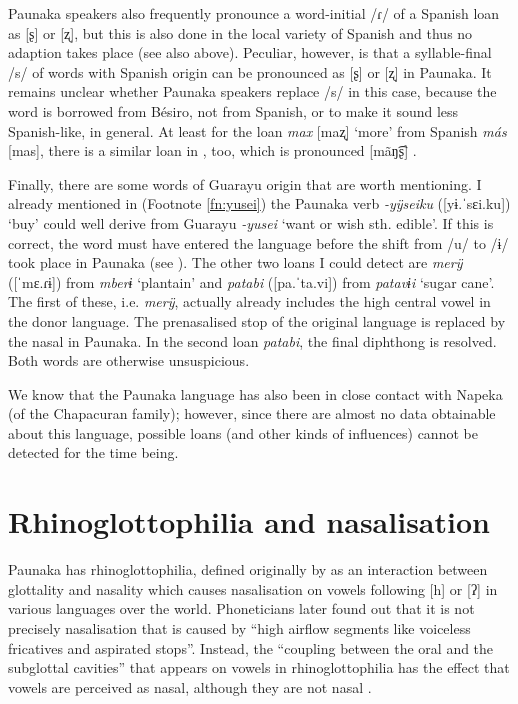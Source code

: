 Paunaka speakers also frequently pronounce a word-initial /ɾ/ of a Spanish loan as [ʂ] or [ʐ], but this is also done in the local variety of Spanish and thus no adaption takes place (see also  above). Peculiar, however, is that a syllable-final /s/ of words with Spanish origin can be pronounced as [ʂ] or [ʐ] in Paunaka. It remains unclear whether Paunaka speakers replace /s/ in this case, because the word is borrowed from Bésiro, not from Spanish, or to make it sound less Spanish-like, in general. At least for the loan \textit{max} [maʐ] ‘more’ from Spanish \textit{más} [mas], there is a similar loan in , too, which is pronounced [mãŋ͡ʂ] \citep[98]{Sans2010}.

Finally, there are some words of Guarayu origin that are worth mentioning. I already mentioned in  (Footnote \ref{fn:yusei}) the Paunaka verb \textit{-yÿseiku} ([yɨ.ˈsɛi.ku]) ‘buy’ could well derive from Guarayu \textit{-yusei} ‘want or wish sth. edible’. If this is correct, the word must have entered the language before the shift from /u/ to /ɨ/ took place in Paunaka (see ). The other two loans I could detect are \textit{merÿ} ([ˈmɛ.ɾɨ]) from \textit{mberɨ} ‘plantain’ and \textit{patabi} ([pa.ˈta.vi]) from \textit{patavɨi} ‘sugar cane’. The first of these, i.e. \textit{merÿ}, actually already includes the high central vowel in the donor language. The prenasalised stop of the original language is replaced by the nasal in Paunaka. In the second loan \textit{patabi}, the final diphthong is resolved. Both words are otherwise unsuspicious.

\hspace*{-1.9pt}We know that the Paunaka language has also been in close contact with Napeka (of the Chapacuran family); however, since there are almost no data obtainable about this language, possible loans (and other kinds of influences) cannot be detected for the time being.

\section{Rhinoglottophilia and nasalisation} \label{Nasalisation}
Paunaka has rhinoglottophilia, defined originally by \citet{Matisoff1975} as an interaction between glottality and nasality which causes nasalisation on vowels following [h] or [ʔ] in various languages over the world.
Phoneticians later found out that it is not precisely nasalisation that is caused by “high airflow segments like voiceless fricatives and aspirated stops”. Instead, the “coupling between the oral and the subglottal cavities” that appears on vowels in rhinoglottophilia has the effect that vowels are perceived as nasal, although they are not nasal \citep[240]{OhalaOhala1993}.

